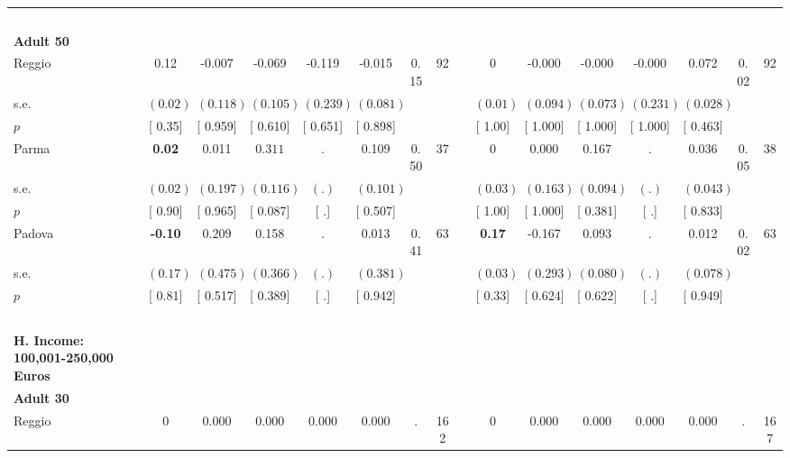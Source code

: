 \begin{longtable}{L{8em} c c c c c c c p{1em} c c c c c c c}
~\\[1em]
\quad \quad \textbf{Adult 50} & & & & & & & & & & & & & & & \\* 
\quad \quad \quad Reggio& 0.12 &    -0.007 &    -0.069 &    -0.119 &    -0.015 &      0.15 &        92 & & 0 &    -0.000 &    -0.000 &    -0.000 &     0.072 &      0.02 &        92  \\*
\quad \quad \quad \quad s.e.& $ (     0.02)$ & $ (    0.118)$ & $ (    0.105)$ & $ (    0.239)$ & $ (    0.081)$ & & & & $ (     0.01)$ & $ (    0.094)$ & $ (    0.073)$ & $ (    0.231)$ & $ (    0.028)$ & &  \\*
\quad \quad \quad \quad $ p$ & [     0.35] & [    0.959] & [    0.610] & [    0.651] & [    0.898] & & & & [     1.00] & [    1.000] & [    1.000] & [    1.000] & [    0.463] & &  \\[1em]
\quad \quad \quad Parma& \textbf{     0.02} &     0.011 & $ \mathbf{    0.311}$ &         . &     0.109 &      0.50 &        37 & & 0 &     0.000 &     0.167 &         . &     0.036 &      0.05 &        38  \\*
\quad \quad \quad \quad s.e.& $ (     0.02)$ & $ (    0.197)$ & $ (    0.116)$ & $ (        .)$ & $ (    0.101)$ & & & & $ (     0.03)$ & $ (    0.163)$ & $ (    0.094)$ & $ (        .)$ & $ (    0.043)$ & &  \\*
\quad \quad \quad \quad $ p$ & [     0.90] & [    0.965] & [    0.087] & [        .] & [    0.507] & & & & [     1.00] & [    1.000] & [    0.381] & [        .] & [    0.833] & &  \\[1em]
\quad \quad \quad Padova& \textbf{    -0.10} &     0.209 &     0.158 &         . &     0.013 &      0.41 &        63 & & \textbf{     0.17} &    -0.167 &     0.093 &         . &     0.012 &      0.02 &        63  \\*
\quad \quad \quad \quad s.e.& $ (     0.17)$ & $ (    0.475)$ & $ (    0.366)$ & $ (        .)$ & $ (    0.381)$ & & & & $ (     0.03)$ & $ (    0.293)$ & $ (    0.080)$ & $ (        .)$ & $ (    0.078)$ & &  \\*
\quad \quad \quad \quad $ p$ & [     0.81] & [    0.517] & [    0.389] & [        .] & [    0.942] & & & & [     0.33] & [    0.624] & [    0.622] & [        .] & [    0.949] & &  \\[1em]
~\\[1em]
\textbf{H. Income: 100,001-250,000 Euros} \\*
\quad \quad \textbf{Adult 30} & & & & & & & & & & & & & & & \\* 
\quad \quad \quad Reggio& 0 &     0.000 &     0.000 &     0.000 &     0.000 &         . &       162 & & 0 &     0.000 &     0.000 &     0.000 &     0.000 &         . &       167  \\*

\end{longtable}
